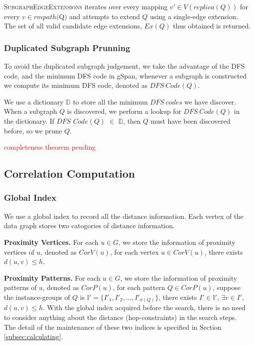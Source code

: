 {\textsc{SubgraphEdgeExtensions} iterates over every mapping $v'\in
V(replica(Q))$ for every $v\in rmpath($Q$)$ and attempts to extend $Q$ using a
single-edge extension. The set of all valid candidate edge extensions, $Ex(Q)$ thus
obtained is returned.

\subsubsection{Duplicated Subgraph Prunning}
To avoid the duplicated subgraph judgement, we take the advantage of the DFS
code, and the minimum DFS code in gSpan\cite{YH02}, whenever a subgraph is
constructed we compute its minimum DFS code, denoted as $DFS\ Code(Q)$.

\par We use a dictionary $\mathbb{D}$ to store all the minimum $DFS\ codes$ we have
discover. When a subgraph $Q$ is discovered, we perform a lookup for $DFS\ Code(Q)$ in the
dictionary. If $DFS$ $Code(Q)$ $\in$ $\mathbb{D}$, then $Q$ must have been discovered before,
so we prune $Q$.

\textcolor{red}{completeness theorem pending}
}

\subsection{Correlation Computation}
\label{subsec:corrcomp}

\subsubsection{Global Index}
\label{subsec:global-index}

We use a global index to record all the distance information. Each vertex of the data graph stores two catogories of distance information.

\squishlist
\item{\bf Proximity Vertices.} For each $u\in G$, we store the information of proximity vertices of $u$, denoted as $CorV(u)$, for each vertex $u\in CorV(u)$, there exists $d(u,v)\le h$.
\squishend
\squishlist
\item{\bf Proximity Patterns.} For each $u\in G$, we store the information of proximity patterns of $u$, denoted as $CorP(u)$, for each pattern $Q\in CorP(u)$, suppose the instance-groups of $Q$ is $\mathbb{I'}=\{I'_1,I'_2,\ldots,I'_{\sigma(Q)}\}$, there exists $I'\in \mathbb{I'}$, $\exists v\in I'$, $d(u,v)\le h$.
\squishend
With the global index acquired before the search, there is no need to consider anything about the distance (hop-constraints) in the search steps. The detail of the maintenance of these two indices is specified in Section \ref{subsec:calculating}.

